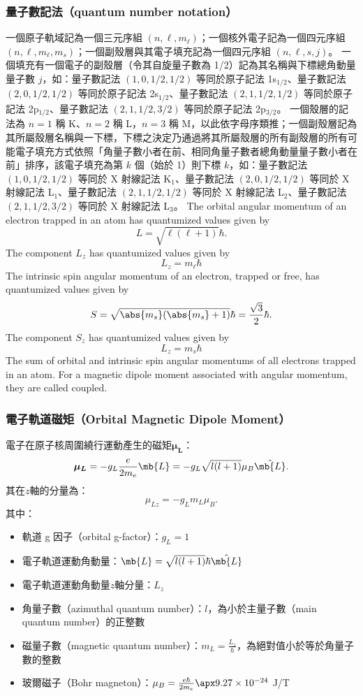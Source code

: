 \documentclass[a4paper,12pt]{report}
\begin{document}
\subsubsection{量子數記法（quantum number notation）}
一個原子軌域記為一個三元序組 $(n,\ell,m_\ell)$；一個核外電子記為一個四元序組 $(n, \ell, m_{\ell}, m_s)$；一個副殼層與其電子填充記為一個四元序組 $(n, \ell, s, j)$。
一個填充有一個電子的副殼層（令其自旋量子數為 1/2）記為其名稱與下標總角動量量子數 $j$，如：量子數記法 $(1,0,1/2,1/2)$ 等同於原子記法 1s$_{1/2}$、量子數記法 $(2,0,1/2,1/2)$ 等同於原子記法 2s$_{1/2}$、量子數記法 $(2,1,1/2,1/2)$ 等同於原子記法 2p$_{1/2}$、量子數記法 $(2,1,1/2,3/2)$ 等同於原子記法 2p$_{3/2}$。
一個殼層的記法為 $n=1$ 稱 K、$n=2$ 稱 L，$n=3$ 稱 M，以此依字母序類推；一個副殼層記為其所屬殼層名稱與一下標，下標之決定乃通過將其所屬殼層的所有副殼層的所有可能電子填充方式依照「角量子數小者在前、相同角量子數者總角動量量子數小者在前」排序，該電子填充為第 $k$ 個（始於 1）則下標 $k$，如：量子數記法 $(1,0,1/2,1/2)$ 等同於 X 射線記法 K$_1$、量子數記法 $(2,0,1/2,1/2)$ 等同於 X 射線記法 L$_1$、量子數記法 $(2,1,1/2,1/2)$ 等同於 X 射線記法 L$_2$、量子數記法 $(2,1,1/2,3/2)$ 等同於 X 射線記法 L$_3$。
The orbital angular momentum of an electron trapped in an atom has quantumized values given by
\[L=\sqrt{\ell(\ell+1)}\hbar.\]
The component $L_z$ has quantumized values given by
\[L_z=m_{\ell}\hbar\]
The intrinsic spin angular momentum of an electron, trapped or free, has quantumized values given by
\[S=\sqrt{\abs{m_s}(\abs{m_s}+1)}\hbar=\frac{\sqrt{3}}{2}\hbar.\]
The component $S_z$ has quantumized values given by
\[L_z=m_s\hbar\]
The sum of orbital and intrinsic spin angular momentums of all electrons trapped in an atom.
For a magnetic dipole moment associated with angular momentum, they are called coupled.
\subsubsection{電子軌道磁矩（Orbital Magnetic Dipole Moment）}
電子在原子核周圍繞行運動產生的磁矩$\boldsymbol{\mu_L}$：
\[\boldsymbol{\mu_L}=-g_L\frac{e}{2m_e}\mb{L}=-g_L\sqrt{l(l+1)}\mu_B\hat{\mb{L}}.\]
其在$z$軸的分量為：
\[\mu_{Lz}=-g_Lm_L\mu_B.\]
其中：
\begin{itemize}
\item 軌道 g 因子（orbital g-factor）：$g_L=1$
\item 電子軌道運動角動量：$\mb{L}=\sqrt{l(l+1)}\hbar\hat{\mb{L}}$
\item 電子軌道運動角動量$z$軸分量：$L_z$
\item 角量子數（azimuthal quantum number）：$l$，為小於主量子數（main quantum number）的正整數
\item 磁量子數（magnetic quantum number）：$m_L=\frac{L_z}{\hbar}$，為絕對值小於等於角量子數的整數
\item 玻爾磁子（Bohr magneton）：$\mu_B=\frac{e\hbar}{2m_e}\apx 9.27\times 10^{-24}$ J/T
\end{itemize}
\end{document}
